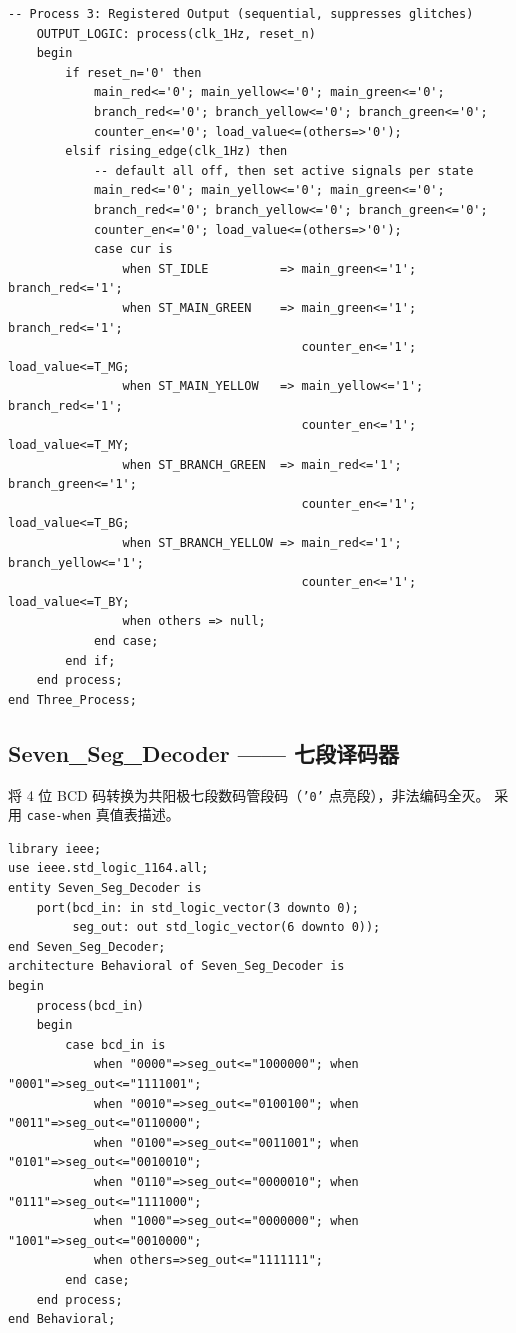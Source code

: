 \documentclass[12pt,a4paper]{ctexart}
\begin{document}
\begin{lstlisting}[caption={Traffic\_Light\_FSM.vhd}]
    -- Process 3: Registered Output (sequential, suppresses glitches)
    OUTPUT_LOGIC: process(clk_1Hz, reset_n)
    begin
        if reset_n='0' then
            main_red<='0'; main_yellow<='0'; main_green<='0';
            branch_red<='0'; branch_yellow<='0'; branch_green<='0';
            counter_en<='0'; load_value<=(others=>'0');
        elsif rising_edge(clk_1Hz) then
            -- default all off, then set active signals per state
            main_red<='0'; main_yellow<='0'; main_green<='0';
            branch_red<='0'; branch_yellow<='0'; branch_green<='0';
            counter_en<='0'; load_value<=(others=>'0');
            case cur is
                when ST_IDLE          => main_green<='1'; branch_red<='1';
                when ST_MAIN_GREEN    => main_green<='1'; branch_red<='1';
                                         counter_en<='1'; load_value<=T_MG;
                when ST_MAIN_YELLOW   => main_yellow<='1'; branch_red<='1';
                                         counter_en<='1'; load_value<=T_MY;
                when ST_BRANCH_GREEN  => main_red<='1'; branch_green<='1';
                                         counter_en<='1'; load_value<=T_BG;
                when ST_BRANCH_YELLOW => main_red<='1'; branch_yellow<='1';
                                         counter_en<='1'; load_value<=T_BY;
                when others => null;
            end case;
        end if;
    end process;
end Three_Process;
\end{lstlisting}

\subsection{Seven\_Seg\_Decoder —— 七段译码器}

将 4 位 BCD 码转换为共阳极七段数码管段码（\texttt{'0'} 点亮段），非法编码全灭。
采用 \texttt{case-when} 真值表描述。

\begin{lstlisting}[caption={Seven\_Seg\_Decoder.vhd}]
library ieee;
use ieee.std_logic_1164.all;
entity Seven_Seg_Decoder is
    port(bcd_in: in std_logic_vector(3 downto 0);
         seg_out: out std_logic_vector(6 downto 0));
end Seven_Seg_Decoder;
architecture Behavioral of Seven_Seg_Decoder is
begin
    process(bcd_in)
    begin
        case bcd_in is
            when "0000"=>seg_out<="1000000"; when "0001"=>seg_out<="1111001";
            when "0010"=>seg_out<="0100100"; when "0011"=>seg_out<="0110000";
            when "0100"=>seg_out<="0011001"; when "0101"=>seg_out<="0010010";
            when "0110"=>seg_out<="0000010"; when "0111"=>seg_out<="1111000";
            when "1000"=>seg_out<="0000000"; when "1001"=>seg_out<="0010000";
            when others=>seg_out<="1111111";
        end case;
    end process;
end Behavioral;
\end{lstlisting}
\end{document}
